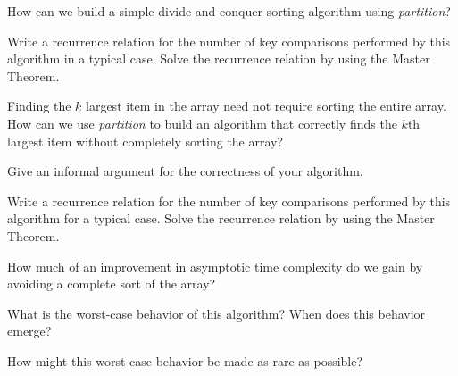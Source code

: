 \documentclass{tufte-handout}
\begin{document}
\begin{questions}
How can we build a simple divide-and-conquer sorting algorithm using \emph{partition}? 

\item Write a recurrence relation for the number of key comparisons performed by this algorithm in a typical case. Solve the recurrence relation by using the Master Theorem. 

\item Finding the $k$ largest item in the array need not require sorting the entire array. How can we use \emph{partition} to build an algorithm that correctly finds the $k$th largest item without completely sorting the array?

\item Give an informal argument for the correctness of your algorithm.

\item Write a recurrence relation for the number of key comparisons performed by this algorithm for a typical case. Solve the recurrence relation by using the Master Theorem.

\item How much of an improvement in asymptotic time complexity do we gain by avoiding a complete sort of the array?

\item What is the worst-case behavior of this algorithm? When does this behavior emerge? 

\item How might this worst-case behavior be made as rare as possible?

\end{questions}
\end{document}
